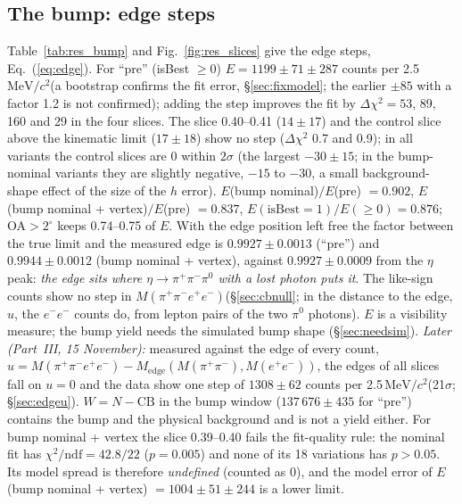 \documentclass[11pt,a4paper]{article}
\newcommand{\piz}{\ensuremath{\pi^{0}}\xspace}
\newcommand{\pipi}{\ensuremath{\pi^{+}\pi^{-}}\xspace}
\newcommand{\Mfour}{\ensuremath{M(\pi^{+}\pi^{-}e^{+}e^{-})}\xspace}
\newcommand{\Mee}{\ensuremath{M(e^{+}e^{-})}\xspace}
\newcommand{\Mpipi}{\ensuremath{M(\pi^{+}\pi^{-})}\xspace}
\newcommand{\MeVcc}{\ensuremath{\mathrm{MeV}/c^{2}}\xspace}
\newcommand{\Medge}{\ensuremath{M_{\mathrm{edge}}}}%
\begin{document}


\subsection{The bump: edge steps}
\label{sec:bump}
Table~\ref{tab:res_bump} and Fig.~\ref{fig:res_slices} give the edge steps, Eq.~(\ref{eq:edge}). For ``pre'' (isBest $\ge0$)
$E=1199\pm71\pm287$ counts per 2.5\,\MeVcc (a bootstrap confirms the fit error, \S\ref{sec:fixmodel}; the earlier $\pm85$ with a factor 1.2 is
not confirmed); adding the step improves the fit by $\Delta\chi^2=53$, 89, 160 and 29 in the four
slices. The slice 0.40--0.41 ($14\pm17$) and the control slice above the kinematic limit ($17\pm18$) show no step
($\Delta\chi^2$ 0.7 and 0.9); in all variants the control slices are 0 within $2\sigma$ (the largest $-30\pm15$; in the bump-nominal
variants they are slightly negative, $-15$ to $-30$, a small background-shape effect of the size of the $h$ error).
$E$(bump nominal)$/E$(pre) $=0.902$, $E$(bump nominal + vertex)$/E$(pre) $=0.837$, $E(\text{isBest}=1)/E(\ge0)=0.876$; OA$>2^\circ$ keeps
0.74--0.75 of $E$. With the edge position left free the factor between the true limit and the measured edge is $0.9927\pm0.0013$
(``pre'') and $0.9944\pm0.0012$ (bump nominal + vertex), against $0.9927\pm0.0009$ from the $\eta$ peak: \emph{the edge sits where
$\eta\to\pipi\piz$ with a lost photon puts it}. The like-sign counts show no step in \Mfour (\S\ref{sec:cbnull}; in the distance to the
edge, $u$, the $e^-e^-$ counts do, from lepton pairs of the two \piz photons). $E$ is a visibility measure; the
bump yield needs the simulated bump shape (\S\ref{sec:needsim}). \emph{Later (Part~III, 15 November):} measured against the edge of every count,
$u=\Mfour-\Medge(\Mpipi,\Mee)$, the edges of all slices fall on $u=0$ and the data show one step of $1308\pm62$ counts per 2.5\,\MeVcc (21$\sigma$;
\S\ref{sec:edgeu}). $W=N-\mathrm{CB}$ in the bump window ($137\,676\pm435$ for ``pre'') contains
the bump and the physical background and is not a yield either. For bump nominal + vertex the slice 0.39--0.40 fails the fit-quality
rule: the nominal fit has $\chi^2/\mathrm{ndf}=42.8/22$ ($p=0.005$) and none of its 18 variations has $p>0.05$. Its model spread is
therefore \emph{undefined} (counted as 0), and the model error of $E$(bump nominal + vertex) $=1004\pm51\pm244$ is a lower limit.


\end{document}
